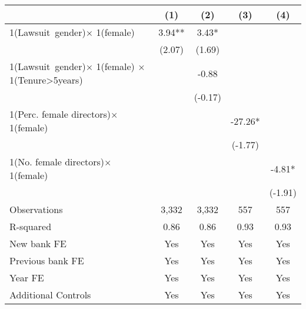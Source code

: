 {
\def\sym#1{\ifmmode^{#1}\else\(^{#1}\)\fi}
\begin{tabular*}{\hsize}{@{\hskip\tabcolsep\extracolsep\fill}l*{4}{c}}
\toprule
                &\multicolumn{1}{c}{(1)}   &\multicolumn{1}{c}{(2)}   &\multicolumn{1}{c}{(3)}   &\multicolumn{1}{c}{(4)}   \\
\midrule
1(Lawsuit~gender)$\times$ 1(female)&     3.94** &     3.43*  &            &            \\
                &   (2.07)   &   (1.69)   &            &            \\
 1(Lawsuit~gender)$\times$ 1(female) $\times$ 1(Tenure>5years)&            &    -0.88   &            &            \\
                &            &  (-0.17)   &            &            \\
 1(Perc. female directors)$\times$ 1(female)&            &            &   -27.26*  &            \\
                &            &            &  (-1.77)   &            \\
 1(No. female directors)$\times$ 1(female)&            &            &            &    -4.81*  \\
                &            &            &            &  (-1.91)   \\
\midrule
Observations    &    3,332   &    3,332   &      557   &      557   \\
R-squared       &     0.86   &     0.86   &     0.93   &     0.93   \\
New bank FE     &      Yes   &      Yes   &      Yes   &      Yes   \\
Previous bank FE&      Yes   &      Yes   &      Yes   &      Yes   \\
Year FE         &      Yes   &      Yes   &      Yes   &      Yes   \\
Additional Controls&      Yes   &      Yes   &      Yes   &      Yes   \\
\bottomrule
\end{tabular*}
}
